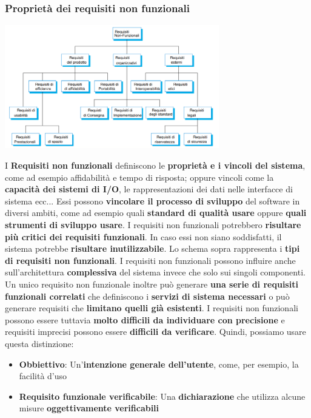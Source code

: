 \documentclass[12pt]{article}
\begin{document}
\subsubsection{Proprietà dei requisiti non funzionali}
\begin{center}
    \includegraphics[width = 0.70\textwidth]{Images/28.PNG}
\end{center}
I \textbf{Requisiti non funzionali} definiscono le \textbf{proprietà e i vincoli del sistema}, come ad esempio affidabilità e tempo di risposta; oppure vincoli come la \textbf{capacità dei sistemi di I/O}, le rappresentazioni dei dati nelle interfacce di sistema ecc...
Essi possono \textbf{vincolare il processo di sviluppo} del software in diversi ambiti, come ad esempio quali \textbf{standard di qualità usare} oppure \textbf{quali strumenti di sviluppo usare}.
I requisiti non funzionali potrebbero \textbf{risultare più critici dei requisiti funzionali}. In caso essi non siano soddisfatti, il sistema potrebbe \textbf{risultare inutilizzabile}.
Lo schema sopra rappresenta i \textbf{tipi di requisiti non funzionali}. I requisiti non funzionali possono influire anche sull'architettura \textbf{complessiva} del sistema invece che solo sui singoli componenti.
Un unico requisito non funzionale inoltre può generare \textbf{una serie di requisiti funzionali correlati} che definiscono i \textbf{servizi di sistema necessari} o può generare requisiti che \textbf{limitano quelli già esistenti}.
I requisiti non funzionali possono essere tuttavia \textbf{molto difficili da individuare con precisione} e requisiti imprecisi possono essere \textbf{difficili da verificare}. Quindi, possiamo usare questa distinzione:
\begin{itemize}
    \item \textbf{Obbiettivo}: Un'\textbf{intenzione generale dell'utente}, come, per esempio, la facilità d'uso
    \item \textbf{Requisito funzionale verificabile}: Una \textbf{dichiarazione} che utilizza alcune misure \textbf{oggettivamente verificabili}
\end{itemize}
\end{document}
